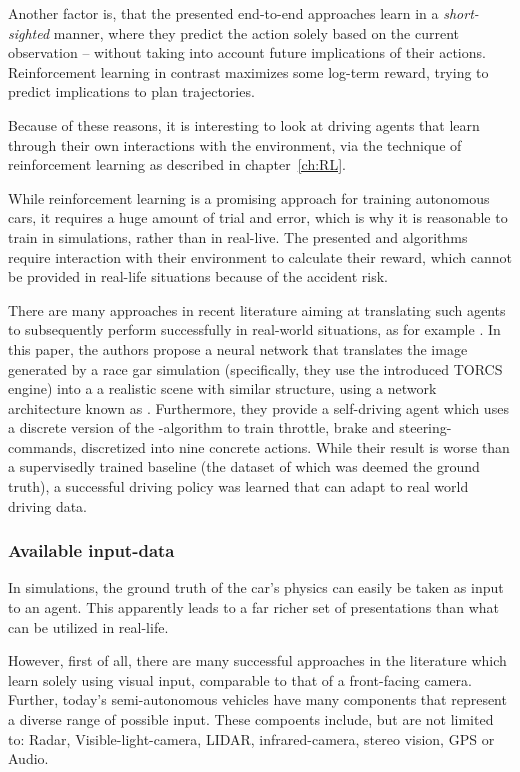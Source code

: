 Another factor is, that the presented end-to-end approaches learn in a \textit{short-sighted} manner, where they predict the action solely based on the current observation -- without taking into account future implications of their actions. Reinforcement learning in contrast maximizes some log-term reward, trying to predict implications to plan trajectories.

Because of these reasons, it is interesting to look at driving agents that learn through their own interactions with the environment, via the technique of reinforcement learning as described in chapter~\ref{ch:RL}.

While reinforcement learning is a promising approach for training autonomous cars, it requires a huge amount of trial and error, which is why it is reasonable to train in simulations, rather than in real-live. The presented  and  algorithms require interaction with their environment to calculate their reward, which cannot be provided in real-life situations because of the accident risk.

There are many approaches in recent literature aiming at translating such agents to subsequently perform successfully in real-world situations, as for example \cite{you_virtual_2017}. In this paper, the authors propose a neural network that translates the image generated by a race gar simulation (specifically, they use the introduced TORCS engine) into a a realistic scene with similar structure, using a network architecture known as \cite{badrinarayanan_segnet:_2015}. 
Furthermore, they provide a self-driving agent which uses a discrete version of the  \cite{mnih_asynchronous_2016}-algorithm to train throttle, brake and steering-commands, discretized into nine concrete actions. While their result is worse than a supervisedly trained baseline (the dataset of which was deemed the ground truth), a successful driving policy was learned that can adapt to real world driving data.

\subsubsection{Available input-data}

In simulations, the ground truth of the car's physics can easily be taken as input to an agent. This apparently leads to a far richer set of presentations than what can be utilized in real-life. 

However, first of all, there are many successful approaches in the literature which learn solely using visual input, comparable to that of a front-facing camera. Further, today's semi-autonomous vehicles have many components that represent a diverse range of possible input. These compoents include, but are not limited to: Radar, Visible-light-camera, LIDAR, infrared-camera, stereo vision, GPS or Audio. 

